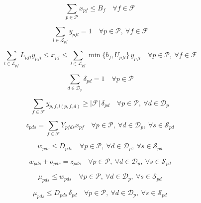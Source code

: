 \documentclass{article}
\begin{document}
\begin{equation}
\sum_{p \in \mathcal{P}} x_{pf} \le B_f
\quad \forall f \in \mathcal{F}
\tag{22b}
\end{equation}

\begin{equation}
\sum_{l \in \mathcal{L}_{pf}} y_{pfl} = 1
\quad \forall p \in \mathcal{P},\ \forall f \in \mathcal{F}
\tag{22c}
\end{equation}

\begin{equation}
\sum_{l \in \mathcal{L}_{pf}} L_{pfl} y_{pfl}
\le x_{pf}
\le \sum_{l \in \mathcal{L}_{pf}} \min\{b_f, U_{pfl}\}\, y_{pfl}
\quad \forall p \in \mathcal{P},\ \forall f \in \mathcal{F}
\tag{22d}
\end{equation}

\begin{equation}
\sum_{d \in \mathcal{D}_p} \delta_{pd} = 1
\quad \forall p \in \mathcal{P}
\tag{22e}
\end{equation}

\begin{equation}
\sum_{f \in \mathcal{F}} y_{p,f,l(p,f,d)} \ge |\mathcal{F}|\, \delta_{pd}
\quad \forall p \in \mathcal{P},\ \forall d \in \mathcal{D}_p
\tag{22f}
\end{equation}

\begin{equation}
z_{pds} = \sum_{f \in \mathcal{F}} Y_{pfds} x_{pf}
\quad \forall p \in \mathcal{P},\ \forall d \in \mathcal{D}_p,\ \forall s \in \mathcal{S}_{pd}
\tag{22g}
\end{equation}

\begin{equation}
w_{pds} \le D_{pds}
\quad \forall p \in \mathcal{P},\ \forall d \in \mathcal{D}_p,\ \forall s \in \mathcal{S}_{pd}
\tag{22h}
\end{equation}

\begin{equation}
w_{pds} + o_{pds} = z_{pds}
\quad \forall p \in \mathcal{P},\ \forall d \in \mathcal{D}_p,\ \forall s \in \mathcal{S}_{pd}
\tag{22i}
\end{equation}

\begin{equation}
\mu_{pds} \le w_{pds}
\quad \forall p \in \mathcal{P},\ \forall d \in \mathcal{D}_p,\ \forall s \in \mathcal{S}_{pd}
\tag{22n}
\end{equation}

\begin{equation}
\mu_{pds} \le D_{pds}\, \delta_{pd}
\quad \forall p \in \mathcal{P},\ \forall d \in \mathcal{D}_p,\ \forall s \in \mathcal{S}_{pd}
\tag{22o}
\end{equation}
\end{document}
